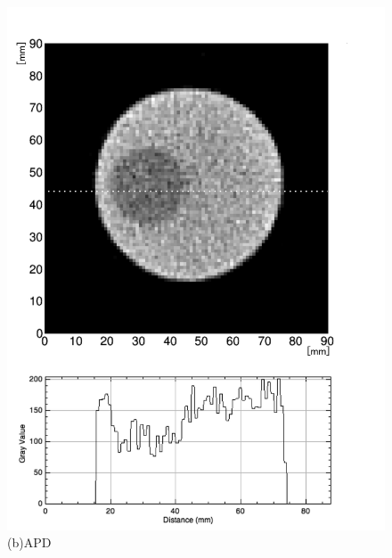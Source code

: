 \begin{figure}[H]
\begin{minipage}{0.52\hsize}
\begin{center}
   \includegraphics[bb=0.000000 0.000000 564.433340 778.975605,width=1.0\hsize]{image2/chapter5/low_contrast_APD_slice.png}
  \end{center}  
  \vspace{-0.7cm}
   \caption*{(b)APD}
 \end{minipage}
   \begin{minipage}{0.5\hsize}
  \begin{center}

\end{center}
\end{minipage}
\end{figure}

